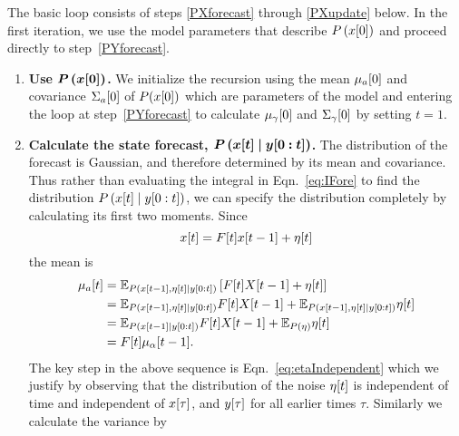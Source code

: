 The basic loop consists of steps \ref{PXforecast} through
\ref{PXupdate} below.  In the first iteration, we use the model
parameters that describe $P\left({x}{[0]} \right)$ and proceed
directly to step~\ref{PYforecast}.
\begin{enumerate}
\item \label{PX1} \textbf{Use $\bm{P\left({x}{[0]} \right)}$.}  We
  initialize the recursion using the mean ${\mu_a}{[0]}$ and
  covariance ${\Sigma_a}{[0]}$ of $P({x}{[0]})$ which are parameters
  of the model and entering the loop at step~\ref{PYforecast} to
  calculate ${\mu_\gamma}{[0]}$ and ${\Sigma_\gamma}{[0]}$ by
  setting $t=1$.
\item \label{PXforecast} \textbf{Calculate the state forecast,
    $\bm{P\left({x}{[t]}\mid y[0:t] \right)}$.}  The distribution
  of the forecast is Gaussian, and therefore determined by its mean
  and covariance.  Thus rather than evaluating the integral in
  Eqn.~\eqref{eq:IFore} to find the distribution
  $P\left({x}{[t]}\mid y[0:t] \right)$, we can specify the
  distribution completely by calculating its first two moments.  Since
  \begin{equation*}
    {x}{[t]} = {F}{[t]} {x}{[t-1]} + {\eta}{[t]}
  \end{equation*}
  the mean is
  \begin{align}
    {\mu_a}{[t]} &= \mathbb{E}_{P
      \left({x}{[t-1]},{\eta}{[t]}\mid y[0:t] \right)} \left[
      {F}{[t]}{X}{[t-1]} + {\eta}{[t]} \right] \nonumber \\
    &= \mathbb{E}_{P\left({x}{[t-1]},{\eta}{[t]}\mid y[0:t] \right)}
      {F}{[t]}{X}{[t-1]} +
      \mathbb{E}_{P\left({x}{[t-1]},{\eta}{[t]}\mid y[0:t] \right)} {\eta}{[t]} \nonumber \\
    \label{eq:etaIndependent}
    &= \mathbb{E}_{P \left({x}{[t-1]}\mid y[0:t] \right)}
    {F}{[t]}{X}{[t-1]}  + \mathbb{E}_{P (\eta)} {\eta}{[t]} \\
     &= {F}{[t]}{\mu_\alpha}{[t-1]}. \nonumber
   \end{align}
   The key step in the above sequence is
   Eqn.~\eqref{eq:etaIndependent} which we justify by observing that
   the distribution of the noise ${\eta}{[t]}$ is independent of time
   and independent of ${x}{[\tau]}$, and ${y}{[\tau]}$ for all
   earlier times $\tau$.  Similarly we calculate the
   variance by
   \begin{align}

\end{align}
\end{enumerate}
